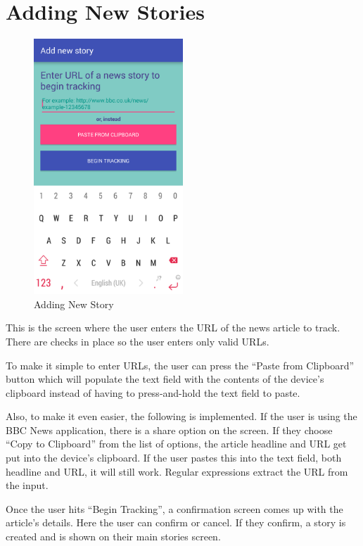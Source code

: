 \documentclass[11pt,titlepage]{report}
\begin{document}
\section{Adding New Stories}
\begin{figure}
	\vspace{-1cm}
	\begin{center}
		\includegraphics[width=0.5\textwidth]{img/addNewStory.png}
	\end{center}
	\caption{Adding New Story}
	\vspace{-3cm}
\end{figure}
This is the screen where the user enters the URL of the news article to track. There are checks in place so the user enters only valid URLs. 

To make it simple to enter URLs, the user can press the ``Paste from Clipboard'' button which will populate the text field with the contents of the device's clipboard instead of having to press-and-hold the text field to paste.

Also, to make it even easier, the following is implemented. If the user is using the BBC News application, there is a share option on the screen. If they choose ``Copy to Clipboard'' from the list of options, the article headline and URL get put into the device's clipboard. If the user pastes this into the text field, both headline and URL, it will still work. Regular expressions extract the URL from the input. 

Once the user hits ``Begin Tracking'', a confirmation screen comes up with the article's details. Here the user can confirm or cancel. If they confirm, a story is created and is shown on their main stories screen.
\newpage
\end{document}
